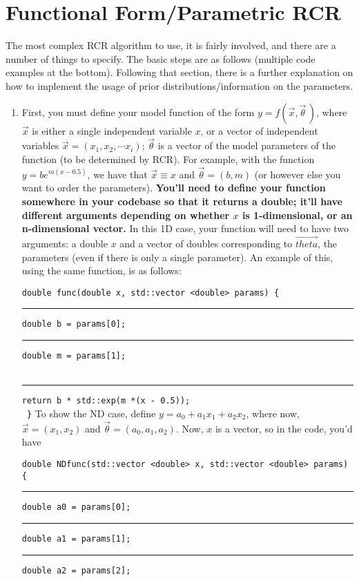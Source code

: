 \documentclass[12pt]{article}
\begin{document}
\section{Functional Form/Parametric RCR}
The most complex RCR algorithm to use, it is fairly involved, and there are a number of things to specify. The basic steps are as follows (multiple code examples at the bottom). Following that section, there is a further explanation on how to implement the usage of prior distributions/information on the parameters.
\begin{enumerate}
	\item First, you must define your model function of the form $y = f(\vec{x},\vec{\theta}\,)$, where $\vec{x}$ is either a single independent variable $x$, or a vector of independent variables $\vec{x} = (x_1, x_2, \cdots x_i)$; $\vec{\theta}$ is a vector of the model parameters of the function (to be determined by RCR). For example, with the function $y = be^{m(x-0.5)}$, we have that $\vec{x} \equiv x$ and $\vec{\theta} = (b, m)$ (or however else you want to order the parameters). \textbf{You'll need to define your function somewhere in your codebase so that it returns a double; it'll have different arguments depending on whether $x$ is 1-dimensional, or an n-dimensional vector.} In this 1D case, your function will need to have two arguments: a double $x$ and a vector of doubles corresponding to $\vec{theta}$, the parameters (even if there is only a single parameter). An example of this, using the same function, is as follows:
	
	\texttt{double func(double x, std::vector <double> params) \{}
	\\\rule{1cm}{0cm}\texttt{double b = params[0];}
	\\\rule{1cm}{0cm}\texttt{double m = params[1];}	
	\\
	\\\rule{1cm}{0cm}\texttt{return b * std::exp(m *(x - 0.5));}
	\\\texttt{	\}}
	\newpage 
	To show the ND case, define $y = a_0 + a_1x_1 + a_2x_2$, where now, $\vec{x} = (x_1, x_2)$ and $\vec{\theta} = (a_0, a_1, a_2)$. Now, $x$ is a vector, so in the code, you'd have
	
	\texttt{double NDfunc(std::vector <double> x, std::vector <double> params) \{}
	\\\rule{1cm}{0cm}\texttt{double a0 = params[0];}
	\\\rule{1cm}{0cm}\texttt{double a1 = params[1];}
	\\\rule{1cm}{0cm}\texttt{double a2 = params[2];}
		

\end{enumerate}
\end{document}
